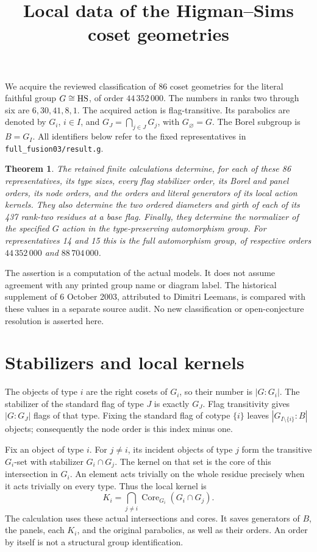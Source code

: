\documentclass[11pt]{article}
\title{Local data of the Higman--Sims coset geometries}
\author{}\date{}
\newtheorem{theorem}{Theorem}\newtheorem{lemma}{Lemma}
\begin{document}
\maketitle
We acquire the reviewed classification of 86 coset geometries for the
literal faithful group $G\cong\mathrm{HS}$, of order $44\,352\,000$.
The numbers in ranks two through six are $6,30,41,8,1$.
The acquired action is flag-transitive. Its parabolics are denoted by
$G_i$, $i\in I$, and $G_J=\bigcap_{j\in J}G_j$, with $G_\varnothing=G$.
The Borel subgroup is $B=G_I$. All identifiers below refer to the fixed
representatives in \texttt{full\_fusion03/result.g}.

\begin{theorem}
The retained finite calculations determine, for each of these 86
representatives, its type sizes, every flag stabilizer order, its Borel
and panel orders, its node orders, and the orders and literal generators
of its local action kernels. They also determine the two ordered
diameters and girth of each of its 437 rank-two residues at a base flag.
Finally, they determine the normalizer of the specified $G$ action in
the type-preserving automorphism group. For representatives 14 and 15
this is the full automorphism group, of respective orders
$44\,352\,000$ and $88\,704\,000$.
\end{theorem}

The assertion is a computation of the actual models. It does not assume
agreement with any printed group name or diagram label. The historical
supplement of 6 October 2003, attributed to Dimitri Leemans, is compared
with these values in a separate source audit. No new classification or
open-conjecture resolution is asserted here.

\section*{Stabilizers and local kernels}
The objects of type $i$ are the right cosets of $G_i$, so their number
is $|G:G_i|$. The stabilizer of the standard flag of type $J$ is exactly
$G_J$. Flag transitivity gives $|G:G_J|$ flags of that type. Fixing the
standard flag of cotype $\{i\}$ leaves $|G_{I\setminus\{i\}}:B|$
objects; consequently the node order is this index minus one.

Fix an object of type $i$. For $j\ne i$, its incident objects of type
$j$ form the transitive $G_i$-set with stabilizer $G_i\cap G_j$.
The kernel on that set is the core of this intersection in $G_i$.
An element acts trivially on the whole residue precisely when it acts
trivially on every type. Thus the local kernel is
\[
 K_i=\bigcap_{j\ne i}\operatorname{Core}_{G_i}(G_i\cap G_j).
\]
The calculation uses these actual intersections and cores. It saves
generators of $B$, the panels, each $K_i$, and the original parabolics,
as well as their orders. An order by itself is not a structural group
identification.
\end{document}
